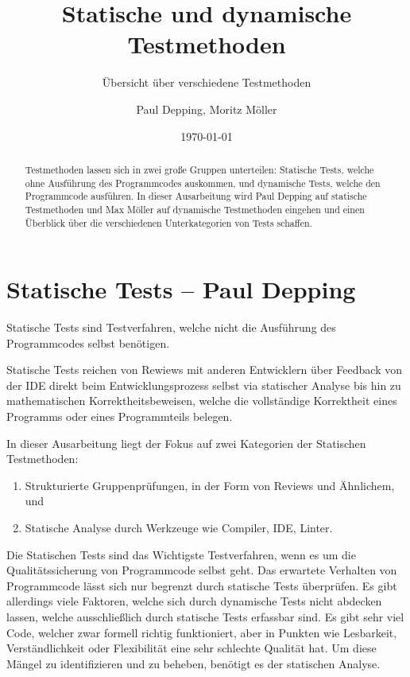 \documentclass[	%
		fontsize=11pt,  %
		a4paper,	    %
		ngerman,		%
		sans,			%
		f4,				%
	]{HsH-report}		%
\author{
	Paul Depping,
	Moritz Möller
}
\title{Statische und dynamische Testmethoden}
\subtitle{Übersicht über verschiedene Testmethoden}
\date{\today}
\begin{document}

\frontmatter

\maketitle[c]

\declarationAuthorship

\begin{abstract}

	Testmethoden lassen sich in zwei große Gruppen unterteilen: Statische Tests,
	welche ohne Ausführung des Programmcodes auskommen, und dynamische Tests,
	welche den Programmcode ausführen. In dieser Ausarbeitung wird Paul Depping auf
	statische Testmethoden und Max Möller auf dynamische Testmethoden eingehen und
	einen Überblick über die verschiedenen Unterkategorien von Tests schaffen.

\end{abstract}

\tableofcontents

\mainmatter

\chapter{Statische Tests -- Paul Depping} \label{chap: static}
Statische Tests sind Testverfahren, welche nicht die Ausführung des
Programmcodes selbst benötigen.

Statische Tests reichen von Rewiews mit anderen Entwicklern über Feedback von
der IDE direkt beim Entwicklungsprozess selbst via statischer Analyse bis hin
zu mathematischen Korrektheitsbeweisen, welche die vollständige Korrektheit
eines Programms oder eines Programmteils belegen.

In dieser Ausarbeitung liegt der Fokus auf zwei Kategorien der Statischen
Testmethoden:
\begin{enumerate}
	\item Strukturierte Gruppenprüfungen, in der Form von Reviews und Ähnlichem, und
	\item Statische Analyse durch Werkzeuge wie Compiler, IDE, Linter.
\end{enumerate}

Die Statischen Tests sind das Wichtigste Testverfahren, wenn es um die
Qualitätssicherung von Programmcode selbst geht. Das erwartete Verhalten von
Programmcode lässt sich nur begrenzt durch statische Tests überprüfen. Es gibt
allerdings viele Faktoren, welche sich durch dynamische Tests nicht abdecken
lassen, welche ausschließlich durch statische Tests erfassbar sind. Es gibt
sehr viel Code, welcher zwar formell richtig funktioniert, aber in Punkten wie
Lesbarkeit, Verständlichkeit oder Flexibilität eine sehr schlechte Qualität
hat. Um diese Mängel zu identifizieren und zu beheben, benötigt es der
statischen Analyse.
\end{document}
